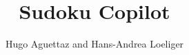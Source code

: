 \documentclass{beamer}
\title{Sudoku Copilot}
\author{Hugo Aguettaz and Hans-Andrea Loeliger}
\institute{Institut für Signal- und Informationsverarbeitung\\ETH Zürich}
\begin{document}
	\begin{frame}
		\titlepage
	\end{frame} 
\end{document}
